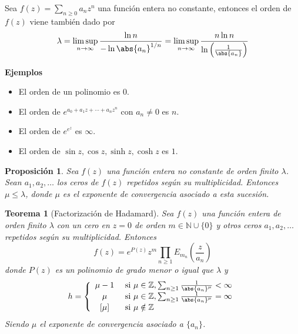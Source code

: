 \documentclass[10pt]{book}
\newtheorem{theorem}{Teorema}[chapter]
\newtheorem{prop}{Proposición}[chapter]
\newcommand{\N}{\mathbb{N}}
\newcommand{\Z}{\mathbb{Z}}
\begin{document}
Sea $f(z)= \sum_{n\geq 0} a_n z^n$ una función entera no constante, entonces el orden de $f(z)$ viene también dado por 
$$\lambda = \limsup_{n\to \infty} \frac{\ln n}{-\ln \abs{a_n}^{1/n}} = \limsup_{n\to \infty} \frac{n\ln n}{\ln \left(\frac{1}{\abs{a_n}}\right)}
$$

\textbf{Ejemplos}

\begin{itemize}
\item El orden de un polinomio es $0$.
\item El orden de $e^{a_0+a_1z+\cdots+a_nz^n}$ con $a_n \neq 0$ es $n$.
\item El orden de $e^{e^z}$ es $\infty$.
\item El orden de $\sin z, \cos z, \sinh z, \cosh z$ es $1$.
\end{itemize}

\begin{prop}
Sea $f(z)$ una función entera no constante de orden finito $\lambda$. Sean $a_1,a_2,\ldots$ los ceros de $f(z)$ repetidos según su multiplicidad. Entonces $\mu \leq \lambda$, donde $\mu$ es el exponente de convergencia asociado a esta sucesión.
\end{prop}


\begin{theorem}[Factorización de Hadamard]
Sea $f(z)$ una función entera de orden finito $\lambda$ con un cero en $z=0$ de orden $m \in \N \cup\{0\}$ y otros ceros $a_1,a_2,\ldots$ repetidos según su multiplicidad. Entonces
$$f(z) = e^{P(z)}z^m \prod_{n\geq 1} E_{m_n}\left(\frac{z}{a_n}\right)$$
donde $P(z)$ es un polinomio de grado menor o igual que $\lambda$ y 
$$
h  = \left\lbrace\begin{array}{cl}
	\mu - 1 & \text{ si } \mu \in \Z, \sum_{n\geq 1}\frac{1}{\abs{a_n}^\mu} < \infty\\
	\mu & \text{ si } \mu \in \Z, \sum_{n\geq 1}\frac{1}{\abs{a_n}^\mu} = \infty\\
	\left[\mu\right]  & \text{ si } \mu \notin \Z
\end{array}\right.
$$
Siendo $\mu$ el exponente de convergencia asociado a $\{a_n\}$.
\end{theorem}
\end{document}
